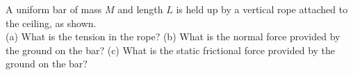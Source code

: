 A uniform bar of mass $M$ and length $L$ is held up
by a vertical rope attached to the ceiling, as shown.\\
%
(a) What is the tension in the rope?\answercheck\hwendpart
%
(b) What is the normal force provided by the ground on the
bar?\answercheck\hwendpart
%
(c) What is the static frictional force provided by the ground on the
bar?\answercheck
